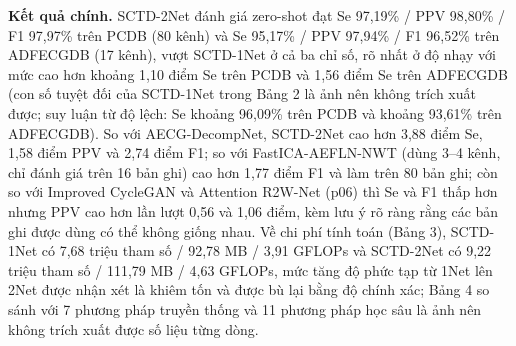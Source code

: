 \documentclass[12pt,a4paper]{article}
\begin{document}
\noindent \textbf{Kết quả chính.} SCTD-2Net đánh giá zero-shot đạt Se 97,19\% / PPV 98,80\% / F1 97,97\% trên PCDB (80 kênh) và Se 95,17\% / PPV 97,94\% / F1 96,52\% trên ADFECGDB (17 kênh), vượt SCTD-1Net ở cả ba chỉ số, rõ nhất ở độ nhạy với mức cao hơn khoảng 1,10 điểm Se trên PCDB và 1,56 điểm Se trên ADFECGDB (con số tuyệt đối của SCTD-1Net trong Bảng 2 là ảnh nên không trích xuất được; suy luận từ độ lệch: Se khoảng 96,09\% trên PCDB và khoảng 93,61\% trên ADFECGDB). So với AECG-DecompNet, SCTD-2Net cao hơn 3,88 điểm Se, 1,58 điểm PPV và 2,74 điểm F1; so với FastICA-AEFLN-NWT (dùng 3–4 kênh, chỉ đánh giá trên 16 bản ghi) cao hơn 1,77 điểm F1 và làm trên 80 bản ghi; còn so với Improved CycleGAN và Attention R2W-Net (p06) thì Se và F1 thấp hơn nhưng PPV cao hơn lần lượt 0,56 và 1,06 điểm, kèm lưu ý rõ ràng rằng các bản ghi được dùng có thể không giống nhau. Về chi phí tính toán (Bảng 3), SCTD-1Net có 7,68 triệu tham số / 92,78 MB / 3,91 GFLOPs và SCTD-2Net có 9,22 triệu tham số / 111,79 MB / 4,63 GFLOPs, mức tăng độ phức tạp từ 1Net lên 2Net được nhận xét là khiêm tốn và được bù lại bằng độ chính xác; Bảng 4 so sánh với 7 phương pháp truyền thống và 11 phương pháp học sâu là ảnh nên không trích xuất được số liệu từng dòng.\par\vspace{3pt}
\end{document}
